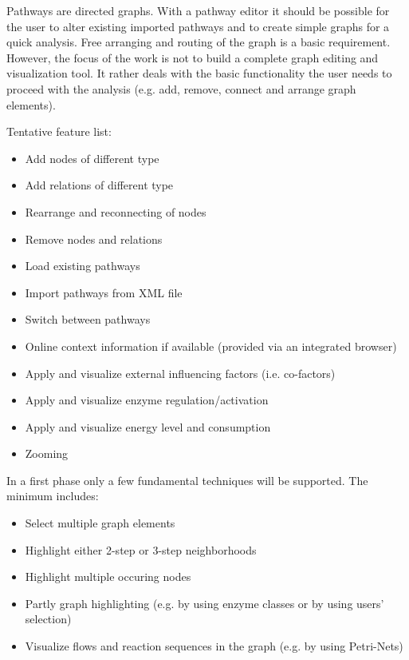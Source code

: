 
Pathways are directed graphs. With a pathway editor it should be possible for the user to alter existing imported pathways and to create simple graphs for a quick analysis. Free arranging and routing of the graph is a basic requirement. However, the focus of the work is not to build a complete graph editing and visualization tool. It rather deals with the basic functionality the user needs to proceed with the analysis (e.g. add, remove, connect and arrange graph elements).

Tentative feature list:
\begin{itemize}
\item Add nodes of different type
\item Add relations of different type
\item Rearrange and reconnecting of nodes
\item Remove nodes and relations
\item Load existing pathways
\item Import pathways from XML file
\item Switch between pathways
\item Online context information if available (provided via an integrated browser)
\item Apply and visualize external influencing factors (i.e. co-factors)
\item Apply and visualize enzyme regulation/activation
\item Apply and visualize energy level and consumption
\item Zooming
\end{itemize}


In a first phase only a few fundamental techniques will be supported. 
The minimum includes:
\begin{itemize}
\item Select multiple graph elements
\item Highlight either 2-step or 3-step neighborhoods
\item Highlight multiple occuring nodes
\item Partly graph highlighting (e.g. by using enzyme classes or by using users' selection)
\item Visualize flows and reaction sequences in the graph (e.g. by using Petri-Nets)
\end{itemize}

